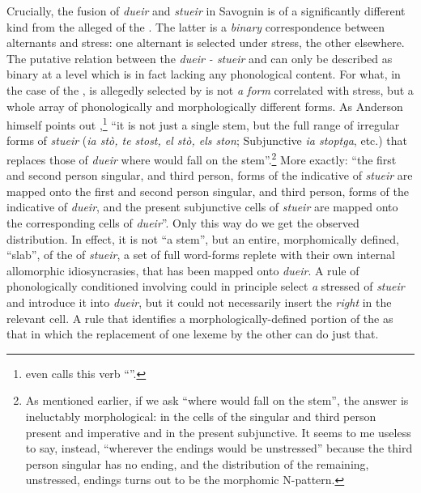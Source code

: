\documentclass[output=paper,
modfonts
]{LSP/langsci}
\begin{document}
Crucially, the  fusion of \emph{dueir} and \emph{stueir} in
Savognin is of a significantly different kind from the alleged
 of the . The
latter is a \emph{binary} correspondence between alternants and stress:
one alternant is selected under stress, the other elsewhere. The
putative relation between the \emph{dueir - stueir}  and
 can only be described as binary at a level which is in fact
lacking any phonological content. For what, in the case of the
, is allegedly selected by  is not \emph{a form}
correlated with stress, but a whole array of phonologically and
morphologically different forms. As Anderson himself points out
\citeyear[124]{anderson2008a},\footnote{\citet[29]{anderson2010a} even calls this verb
  ``''.} ``it is not just a single stem, but the full range of
irregular forms of \emph{stueir} (\emph{ia stò, te stost, el stò, els
ston}; Subjunctive \emph{ia stoptga}, etc.) that replaces those of
\emph{dueir} where  would fall on the stem''.\footnote{As mentioned
  earlier, if we ask ``where  would fall on the stem'', the answer
  is ineluctably morphological: in the cells of the singular and third
  person present and imperative and in the present subjunctive. It seems
  to me useless to say, instead, ``wherever the endings would be
  unstressed'' because the third person singular has no ending, and the
  distribution of the remaining, unstressed, endings turns out to be the
  morphomic N-pattern.} More exactly: ``the first and second person
singular, and third person, forms of the indicative of \emph{stueir} are
mapped onto the first and second person singular, and third person,
forms of the indicative of \emph{dueir}, and the present subjunctive
cells of \emph{stueir} are mapped onto the corresponding cells of
\emph{dueir}''. Only this way do we get the observed distribution. In
effect, it is not ``a stem'', but an entire, morphomically defined,
``slab'', of the  of \emph{stueir}, a set of full word-forms
replete with their own internal allomorphic idiosyncrasies, that has
been mapped onto \emph{dueir}. A rule of phonologically conditioned
 involving  could in principle select \emph{a} stressed
  of \emph{stueir} and introduce it into \emph{dueir}, but
it could not necessarily insert the \emph{right}   in the
relevant cell. A rule that identifies a morphologically-defined portion
of the  as that in which the replacement of one lexeme by the
other can do just that.
\end{document}

